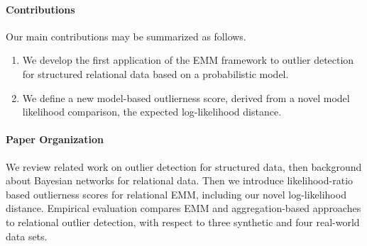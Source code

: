 {\paragraph{Contributions} Our main contributions may be 
summarized as follows.

\begin{enumerate} 
	\item We develop the first application of the EMM framework to outlier detection for structured relational data based on a probabilistic model. 
	\item We define a new model-based outlierness score, derived from a novel model likelihood comparison, the expected log-likelihood distance.  %
\end{enumerate}
				
%				

\paragraph{Paper Organization} We review related work on outlier detection for structured data, then background about Bayesian networks for relational data. Then we introduce likelihood-ratio based outlierness scores for relational EMM, including our novel log-likelihood distance. 
Empirical evaluation compares EMM and aggregation-based approaches to relational outlier detection, with respect to three synthetic and four real-world data sets.

}
